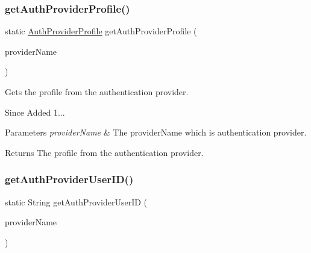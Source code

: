 \subsubsection{\texorpdfstring{get\+Auth\+Provider\+Profile()}{getAuthProviderProfile()}}
{\footnotesize\ttfamily static \hyperlink{classcom_1_1toast_1_1android_1_1gamebase_1_1base_1_1auth_1_1_auth_provider_profile}{Auth\+Provider\+Profile} get\+Auth\+Provider\+Profile (\begin{DoxyParamCaption}\item[{@Non\+Null String}]{provider\+Name }\end{DoxyParamCaption})\hspace{0.3cm}{\ttfamily [static]}}



Gets the profile from the authentication provider. 

\begin{DoxySince}{Since}
Added 1... 
\end{DoxySince}

\begin{DoxyParams}{Parameters}
{\em provider\+Name} & The provider\+Name which is authentication provider. \\
\hline
\end{DoxyParams}
\begin{DoxyReturn}{Returns}
The profile from the authentication provider. 
\end{DoxyReturn}
\mbox{\label{classcom_1_1toast_1_1android_1_1gamebase_1_1_gamebase_af1dc0a9194eff5829c859a6a6aa4ab7c}} 
\subsubsection{\texorpdfstring{get\+Auth\+Provider\+User\+I\+D()}{getAuthProviderUserID()}}
{\footnotesize\ttfamily static String get\+Auth\+Provider\+User\+ID (\begin{DoxyParamCaption}\item[{@Non\+Null String}]{provider\+Name }\end{DoxyParamCaption})\hspace{0.3cm}{\ttfamily [static]}}



